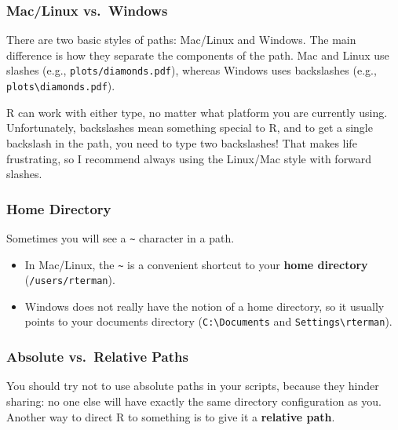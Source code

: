 \documentclass[]{book}
\providecommand{\tightlist}{%
  \setlength{\itemsep}{0pt}\setlength{\parskip}{0pt}}
\begin{document}
\subsubsection*{Mac/Linux vs.~Windows}\label{maclinux-vs.windows}

There are two basic styles of paths: Mac/Linux and Windows. The main
difference is how they separate the components of the path. Mac and
Linux use slashes (e.g., \texttt{plots/diamonds.pdf}), whereas Windows
uses backslashes (e.g., \texttt{plots\textbackslash{}diamonds.pdf}).

R can work with either type, no matter what platform you are currently
using. Unfortunately, backslashes mean something special to R, and to
get a single backslash in the path, you need to type two backslashes!
That makes life frustrating, so I recommend always using the Linux/Mac
style with forward slashes.

\subsubsection*{Home Directory}\label{home-directory}

Sometimes you will see a \texttt{\textasciitilde{}} character in a path.

\begin{itemize}
\tightlist
\item
  In Mac/Linux, the \texttt{\textasciitilde{}} is a convenient shortcut
  to your \textbf{home directory} (\texttt{/users/rterman}).
\item
  Windows does not really have the notion of a home directory, so it
  usually points to your documents directory
  (\texttt{C:\textbackslash{}Documents} and
  \texttt{Settings\textbackslash{}rterman}).
\end{itemize}

\subsubsection*{Absolute vs.~Relative
Paths}\label{absolute-vs.relative-paths}

You should try not to use absolute paths in your scripts, because they
hinder sharing: no one else will have exactly the same directory
configuration as you. Another way to direct R to something is to give it
a \textbf{relative path}.
\end{document}
